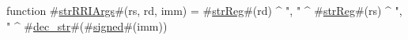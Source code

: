 function #\hyperref[sailMIPSzstrRRIArgs]{strRRIArgs}#(rs, rd, imm) = #\hyperref[sailMIPSzstrReg]{strReg}#(rd) ^ ", " ^ #\hyperref[sailMIPSzstrReg]{strReg}#(rs) ^ ", " ^ #\hyperref[sailMIPSzdeczystr]{dec\_str}#(#\hyperref[sailMIPSzsigned]{signed}#(imm))
